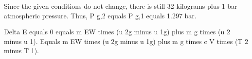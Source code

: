 Since the given conditions do not change, there is still 32 kilograms plus 1 bar atmospheric pressure.  
Thus, P g,2 equals P g,1 equals 1.297 bar.  

Delta E equals 0 equals m EW times (u 2g minus u 1g) plus m g times (u 2 minus u 1).  
Equals m EW times (u 2g minus u 1g) plus m g times c V times (T 2 minus T 1).